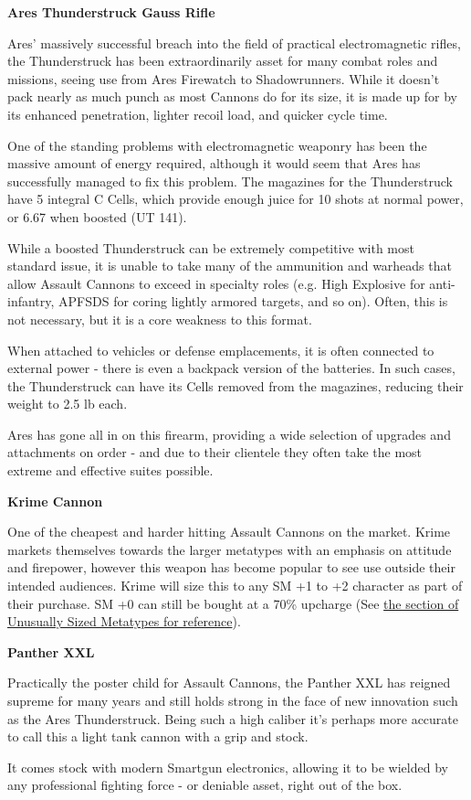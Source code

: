 \begin{multicols}{2}
\begin{breakbox}
\textbf{Ares Thunderstruck Gauss Rifle}
	
Ares' massively successful breach into the field of practical electromagnetic rifles, the Thunderstruck has been extraordinarily asset for many combat roles and missions, seeing use from Ares Firewatch to Shadowrunners. While it doesn't pack nearly as much punch as most Cannons do for its size, it is made up for by its enhanced penetration, lighter recoil load, and quicker cycle time.

One of the standing problems with electromagnetic weaponry has been the massive amount of energy required, although it would seem that Ares has successfully managed to fix this problem. The magazines for the Thunderstruck have 5 integral C Cells, which provide enough juice for 10 shots at normal power, or 6.67 when boosted (UT 141). 

While a boosted Thunderstruck can be extremely competitive with most standard issue, it is unable to take many of the ammunition and warheads that allow Assault Cannons to exceed in specialty roles (e.g. High Explosive for anti-infantry, APFSDS for coring lightly armored targets, and so on). Often, this is not necessary, but it is a core weakness to this format.

When attached to vehicles or defense emplacements, it is often connected to external power - there is even a backpack version of the batteries. In such cases, the Thunderstruck can have its Cells removed from the magazines, reducing their weight to 2.5 lb each.

Ares has gone all in on this firearm, providing a wide selection of upgrades and attachments on order - and due to their clientele they often take the most extreme and effective suites possible.

\textbf{Krime Cannon}

One of the cheapest and harder hitting Assault Cannons on the market. Krime markets themselves towards the larger metatypes with an emphasis on attitude and firepower, however this weapon has become popular to see use outside their intended audiences. Krime will size this to any SM +1 to +2 character as part of their purchase. SM +0 can still be bought at a 70\% upcharge (See \hyperref[metatype_sizing]{the section of Unusually Sized Metatypes for reference}).

\textbf{Panther XXL}

Practically the poster child for Assault Cannons, the Panther XXL has reigned supreme for many years and still holds strong in the face of new innovation such as the Ares Thunderstruck. Being such a high caliber it's perhaps more accurate to call this a light tank cannon with a grip and stock.

It comes stock with modern Smartgun electronics, allowing it to be wielded by any professional fighting force - or deniable asset, right out of the box.
\end{breakbox}
\end{multicols}


